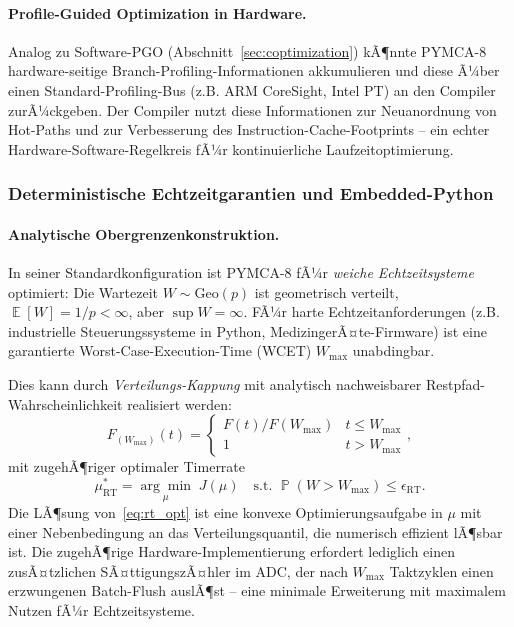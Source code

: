 ﻿\documentclass[a4paper,12pt]{scrreprt}
\theoremstyle{definition}
\DeclareMathOperator{\E}{\mathbb{E}}
\DeclareMathOperator{\Prob}{\mathbb{P}}
\begin{document}
	\paragraph{Profile-Guided Optimization in Hardware.}
	Analog zu Software-PGO (Abschnitt~\ref{sec:coptimization}) kÃ¶nnte PYMCA-8
	hardware-seitige Branch-Profiling-Informationen akkumulieren und diese Ã¼ber
	einen Standard-Profiling-Bus (z.B. ARM CoreSight, Intel PT) an den Compiler
	zurÃ¼ckgeben. Der Compiler nutzt diese Informationen zur Neuanordnung von
	Hot-Paths und zur Verbesserung des Instruction-Cache-Footprints -- ein
	echter Hardware-Software-Regelkreis fÃ¼r kontinuierliche Laufzeitoptimierung.

	\subsubsection{Deterministische Echtzeitgarantien und Embedded-Python}

	\paragraph{Analytische Obergrenzenkonstruktion.}
	In seiner Standardkonfiguration ist PYMCA-8 fÃ¼r \emph{weiche Echtzeitsysteme}
	optimiert: Die Wartezeit $W \sim \mathrm{Geo}(p)$ ist geometrisch verteilt,
	$\E[W] = 1/p < \infty$, aber $\sup W = \infty$. FÃ¼r harte Echtzeitanforderungen
	(z.B. industrielle Steuerungssysteme in Python, MedizingerÃ¤te-Firmware)
	ist eine garantierte Worst-Case-Execution-Time (WCET) $W_{\max}$ unabdingbar.

	Dies kann durch \emph{Verteilungs-Kappung} mit analytisch nachweisbarer Restpfad-Wahrschein\-lichkeit realisiert werden:
	\begin{equation}
		F_{(W_{\max})}(t) =
		\begin{cases} F(t) / F(W_{\max}) & t \le W_{\max} \\ 1 & t > W_{\max} \end{cases},
		\label{eq:capped_dist}
	\end{equation}
	mit zugehÃ¶riger optimaler Timerrate
	\begin{equation}
		\mu_{\mathrm{RT}}^* = \underset{\mu}{\arg\min}\; J(\mu)
		\quad \text{s.t. } \Prob(W > W_{\max}) \le \epsilon_{\mathrm{RT}}.
		\label{eq:rt_opt}
	\end{equation}
	Die LÃ¶sung von~\eqref{eq:rt_opt} ist eine konvexe Optimierungsaufgabe in
	$\mu$ mit einer Nebenbedingung an das Verteilungsquantil, die numerisch
	effizient lÃ¶sbar ist. Die zugehÃ¶rige Hardware-Implementierung erfordert lediglich
	einen zusÃ¤tzlichen SÃ¤ttigungszÃ¤hler im ADC, der nach $W_{\max}$ Taktzyklen
	einen erzwungenen Batch-Flush auslÃ¶st -- eine minimale Erweiterung mit
	maximalem Nutzen fÃ¼r Echtzeitsysteme.
\end{document}
